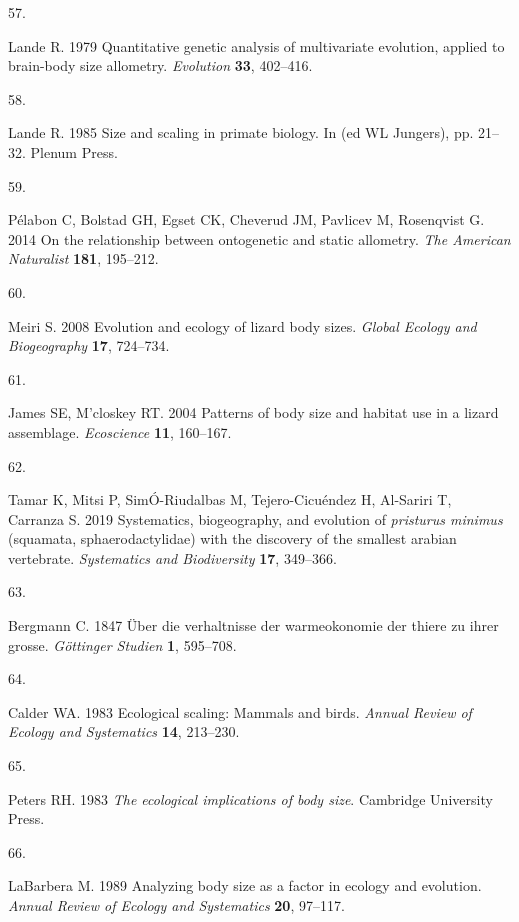 \documentclass[
  11pt,
]{article}
\newlength{\cslhangindent}
\newlength{\csllabelwidth}
\newlength{\cslentryspacingunit} %
\newenvironment{CSLReferences}[2] %
 {%
  \setlength{\parindent}{0pt}
  \ifodd #1
  \let\oldpar\par
  \def\par{\hangindent=\cslhangindent\oldpar}
  \fi
  \setlength{\parskip}{#2\cslentryspacingunit}
 }%
 {}
\newcommand{\CSLLeftMargin}[1]{\parbox[t]{\csllabelwidth}{#1}}
\newcommand{\CSLRightInline}[1]{\parbox[t]{\linewidth - \csllabelwidth}{#1}\break}
\begin{document}
\begin{CSLReferences}{0}{0}
\leavevmode{}%
\CSLLeftMargin{57. }%
\CSLRightInline{Lande R. 1979 Quantitative genetic analysis of
multivariate evolution, applied to brain-body size allometry.
\emph{Evolution} \textbf{33}, 402--416.}

\leavevmode{}%
\CSLLeftMargin{58. }%
\CSLRightInline{Lande R. 1985 Size and scaling in primate biology. In
(ed WL Jungers), pp. 21--32. Plenum Press. }

\leavevmode{}%
\CSLLeftMargin{59. }%
\CSLRightInline{Pélabon C, Bolstad GH, Egset CK, Cheverud JM, Pavlicev
M, Rosenqvist G. 2014 On the relationship between ontogenetic and static
allometry. \emph{The American Naturalist} \textbf{181}, 195--212.}

\leavevmode{}%
\CSLLeftMargin{60. }%
\CSLRightInline{Meiri S. 2008 Evolution and ecology of lizard body
sizes. \emph{Global Ecology and Biogeography} \textbf{17}, 724--734.}

\leavevmode{}%
\CSLLeftMargin{61. }%
\CSLRightInline{James SE, M'closkey RT. 2004 Patterns of body size and
habitat use in a lizard assemblage. \emph{Ecoscience} \textbf{11},
160--167.}

\leavevmode{}%
\CSLLeftMargin{62. }%
\CSLRightInline{Tamar K, Mitsi P, SimÓ-Riudalbas M, Tejero-Cicuéndez H,
Al-Sariri T, Carranza S. 2019 Systematics, biogeography, and evolution
of \emph{pristurus minimus} (squamata, sphaerodactylidae) with the
discovery of the smallest arabian vertebrate. \emph{Systematics and
Biodiversity} \textbf{17}, 349--366.}

\leavevmode{}%
\CSLLeftMargin{63. }%
\CSLRightInline{Bergmann C. 1847 {Ü}ber die verhaltnisse der
warmeokonomie der thiere zu ihrer grosse. \emph{G{ö}ttinger Studien}
\textbf{1}, 595--708.}

\leavevmode{}%
\CSLLeftMargin{64. }%
\CSLRightInline{Calder WA. 1983 Ecological scaling: Mammals and birds.
\emph{Annual Review of Ecology and Systematics} \textbf{14}, 213--230.}

\leavevmode{}%
\CSLLeftMargin{65. }%
\CSLRightInline{Peters RH. 1983 \emph{The ecological implications of
body size}. Cambridge University Press. }

\leavevmode{}%
\CSLLeftMargin{66. }%
\CSLRightInline{LaBarbera M. 1989 Analyzing body size as a factor in
ecology and evolution. \emph{Annual Review of Ecology and Systematics}
\textbf{20}, 97--117.}


\end{CSLReferences}
\end{document}
